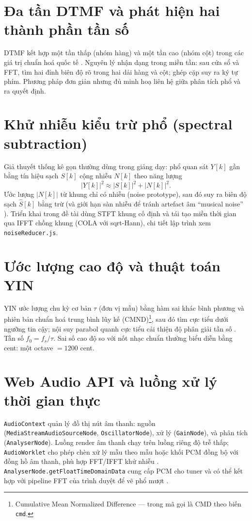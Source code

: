 \section{Đa tần DTMF và phát hiện hai thành phần tần số}
DTMF kết hợp một tần thấp (nhóm hàng) và một tần cao (nhóm cột) trong các giá trị chuẩn hoá quốc tế \cite{ituQ23}. Nguyên lý nhận dạng trong miền tần: sau cửa sổ và FFT, tìm hai đỉnh biên độ rõ trong hai dải hàng và cột; ghép cặp suy ra ký tự phím. Phương pháp đơn giản nhưng đủ minh hoạ liên hệ giữa phân tích phổ và ra quyết định.

\section{Khử nhiễu kiểu trừ phổ (spectral subtraction)}
Giả thuyết thống kê gọn thường dùng trong giảng dạy: phổ quan sát $Y[k]$ gần bằng tín hiệu sạch $S[k]$ cộng nhiễu $N[k]$ theo năng lượng
\begin{equation}
	|Y[k]|^2 \approx |S[k]|^2 + |N[k]|^2 .
\end{equation}
Ước lượng $|N[k]|$ từ khung chỉ có nhiễu (noise prototype), sau đó suy ra biên độ sạch $\hat{S}[k]$ bằng trừ (và giới hạn sàn nhiễu để tránh artefact âm ``musical noise'' \cite{oppenheim}). Triển khai trong đề tài dùng STFT khung cố định và tái tạo miền thời gian qua IFFT chồng khung (COLA với sqrt-Hann), chi tiết lập trình xem \verb|noiseReducer.js|.

\section{Ước lượng cao độ và thuật toán YIN}
YIN ước lượng chu kỳ cơ bản $\tau$ (đơn vị mẫu) bằng hàm sai khác bình phương và phiên bản chuẩn hoá trung bình lũy kế (CMND)\footnote{Cumulative Mean Normalized Difference --- trong mã gọi là CMD theo biến \texttt{cmd}.}, sau đó tìm cực tiểu dưới ngưỡng tin cậy; nội suy parabol quanh cực tiểu cải thiện độ phân giải tần số \cite{cheveigne2002}. Tần số $f_0 = f_s/\tau$. Sai số cao độ so với nốt nhạc chuẩn thường biểu diễn bằng cent: một octave $=1200$ cent.

\section{Web Audio API và luồng xử lý thời gian thực}
\texttt{AudioContext} quản lý đồ thị nút âm thanh: nguồn (\texttt{MediaStreamAudioSourceNode}, \texttt{OscillatorNode}), xử lý (\texttt{GainNode}), và phân tích (\texttt{AnalyserNode}). Luồng render âm thanh chạy trên luồng riêng độ trễ thấp; \texttt{AudioWorklet} cho phép chèn xử lý mẫu theo mẫu hoặc khối PCM đồng bộ với đồng hồ âm thanh, phù hợp FFT/IFFT khử nhiễu \cite{mdnWorklet}. \texttt{AnalyserNode.getFloatTimeDomainData} cung cấp PCM cho tuner và có thể kết hợp với pipeline FFT của trình duyệt để vẽ phổ mượt \cite{mdnAudio}.
